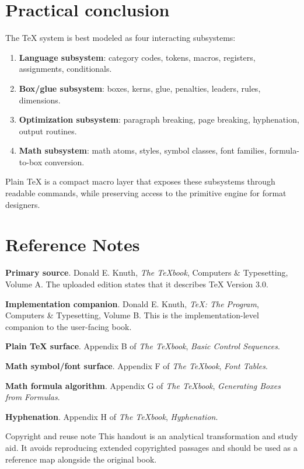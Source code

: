 \documentclass[11pt]{article}
\newcommand{\tightlist}{}
\newcommand{\sourceitem}[2]{\textbf{#1}. #2\par}
\begin{document}
\section{Practical conclusion}\label{practical-conclusion}

The TeX system is best modeled as four interacting subsystems:

\begin{enumerate}
\def\labelenumi{\arabic{enumi}.}
\tightlist
\item
  \textbf{Language subsystem}: category codes, tokens, macros, registers, assignments, conditionals.
\item
  \textbf{Box/glue subsystem}: boxes, kerns, glue, penalties, leaders, rules, dimensions.
\item
  \textbf{Optimization subsystem}: paragraph breaking, page breaking, hyphenation, output routines.
\item
  \textbf{Math subsystem}: math atoms, styles, symbol classes, font families, formula-to-box conversion.
\end{enumerate}

Plain TeX is a compact macro layer that exposes these subsystems through readable commands, while preserving access to the primitive engine for format designers.


\section*{Reference Notes}
\sourceitem{Primary source}{Donald E. Knuth, \emph{The TeXbook}, Computers \& Typesetting, Volume A. The uploaded edition states that it describes TeX Version 3.0.}
\sourceitem{Implementation companion}{Donald E. Knuth, \emph{TeX: The Program}, Computers \& Typesetting, Volume B. This is the implementation-level companion to the user-facing book.}
\sourceitem{Plain TeX surface}{Appendix B of \emph{The TeXbook}, \emph{Basic Control Sequences}.}
\sourceitem{Math symbol/font surface}{Appendix F of \emph{The TeXbook}, \emph{Font Tables}.}
\sourceitem{Math formula algorithm}{Appendix G of \emph{The TeXbook}, \emph{Generating Boxes from Formulas}.}
\sourceitem{Hyphenation}{Appendix H of \emph{The TeXbook}, \emph{Hyphenation}.}

\begin{insightbox}{Copyright and reuse note}
This handout is an analytical transformation and study aid. It avoids reproducing extended copyrighted passages and should be used as a reference map alongside the original book.
\end{insightbox}
\end{document}

